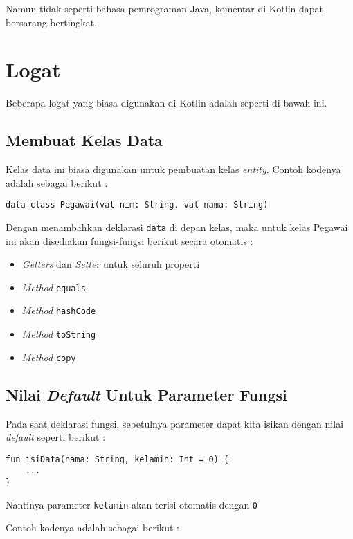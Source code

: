 Namun tidak seperti bahasa pemrograman Java, komentar di Kotlin dapat bersarang bertingkat.

\section{Logat}

Beberapa logat yang biasa digunakan di Kotlin adalah seperti di bawah ini.

\subsection{Membuat Kelas Data}

Kelas data ini biasa digunakan untuk pembuatan kelas \textit{entity}. Contoh kodenya adalah sebagai berikut :

\begin{lstlisting}
data class Pegawai(val nim: String, val nama: String)
\end{lstlisting}

Dengan menambahkan deklarasi \texttt{data} di depan kelas, maka untuk kelas Pegawai ini akan disediakan fungsi-fungsi berikut secara otomatis :

\begin{itemize}
\item \textit{Getters} dan \textit{Setter} untuk seluruh properti
\item \textit{Method} \texttt{equals}.
\item \textit{Method} \texttt{hashCode}
\item \textit{Method} \texttt{toString}
\item \textit{Method} \texttt{copy}
\end{itemize}

\subsection{Nilai \textit{Default} Untuk Parameter Fungsi}

Pada saat deklarasi fungsi, sebetulnya parameter dapat kita isikan dengan nilai \textit{default} seperti berikut :

\begin{lstlisting}
fun isiData(nama: String, kelamin: Int = 0) {
	...
}
\end{lstlisting}

Nantinya parameter \texttt{kelamin} akan terisi otomatis dengan \texttt{0}

Contoh kodenya adalah sebagai berikut :

